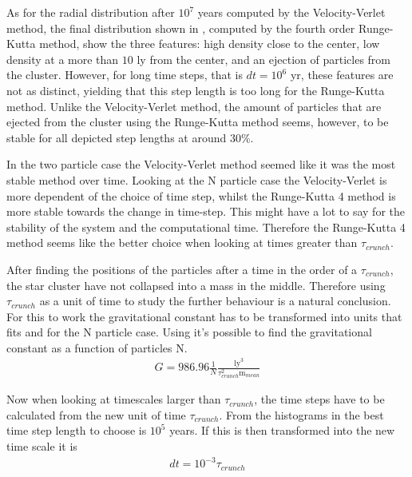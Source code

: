 As for the radial distribution after $10^7$ years computed by the Velocity-Verlet method, the final distribution shown in , computed by the fourth order Runge-Kutta method, show the three features: high density close to the center, low density at a more than $10$ ly from the center, and an ejection of particles from the cluster.
However, for long time steps, that is $dt = 10^6$ yr, these features are not as distinct, yielding that this step length is too long for the Runge-Kutta method. 
Unlike the Velocity-Verlet method, the amount of particles that are ejected from the cluster using the Runge-Kutta method seems, however, to be stable for all depicted step lengths at around $30 \%$. 

In the two particle case the Velocity-Verlet method seemed like it was the most stable method over time. Looking at the N particle case the Velocity-Verlet is more dependent of the choice of time step, whilst the Runge-Kutta 4 method is more stable towards the change in time-step. This might have a lot to say for the stability of the system and the computational time. Therefore the Runge-Kutta 4 method seems like the better choice when looking at times greater than $\tau_{crunch}$. 



After finding the positions of the particles after a time in the order of a $\tau_{crunch}$, the star cluster have not collapsed into a mass in the middle. Therefore using $\tau_{crunch}$ as a unit of time to study the further behaviour is a natural conclusion. For this to work the gravitational constant has to be transformed into units that fits and for the N particle case. Using  it's possible to find the gravitational constant as a function of particles N.  
\begin{align}
G = 986.96 \frac{1}{N} \frac{\textrm{ly}^3}{\tau_{crunch}^2\textrm{m}_{mean}}
\end{align}

Now when looking at timescales larger than $\tau_{crunch}$, the time steps have to be calculated from the new unit of time $\tau_{crunch}$. From the histograms in  the best time step length to choose is $10^5$ years. If this is then transformed into the new time scale it is
\begin{align*}
dt = 10^{-3} \tau_{crunch}
\end{align*}

